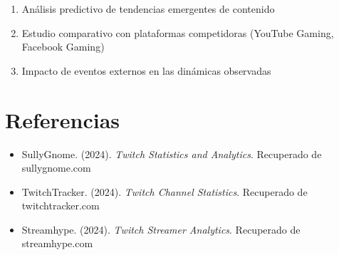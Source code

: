 \documentclass[12pt,a4paper]{article}
\begin{document}
\begin{enumerate}
    \item Análisis predictivo de tendencias emergentes de contenido 
    \item Estudio comparativo con plataformas competidoras (YouTube Gaming, Facebook Gaming) 
    \item Impacto de eventos externos en las dinámicas observadas
\end{enumerate}

\newpage

\section*{Referencias} 

\begin{itemize}
    \item SullyGnome. (2024). \textit{Twitch Statistics and Analytics}. Recuperado de sullygnome.com
    \item TwitchTracker. (2024). \textit{Twitch Channel Statistics}. Recuperado de twitchtracker.com 
    \item Streamhype. (2024). \textit{Twitch Streamer Analytics}. Recuperado de streamhype.com
\end{itemize}
\end{document}

